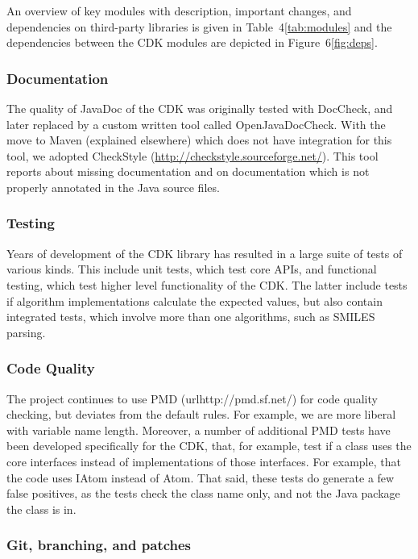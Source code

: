 \documentclass[10pt]{bmcart}
\begin{document}
An overview of key modules with description, important changes, and dependencies
on third-party libraries is given in Table~4\ref{tab:modules} and the dependencies
between the CDK modules are depicted in Figure~6\ref{fig:deps}.

  \subsubsection*{Documentation}

  The quality of JavaDoc of the CDK was originally tested with DocCheck, and
  later replaced by a custom written tool called OpenJavaDocCheck. With the move
  to Maven (explained elsewhere) which does not have integration for this tool,
  we adopted CheckStyle (\url{http://checkstyle.sourceforge.net/}). This tool
  reports about missing documentation and on documentation which is not properly
  annotated in the Java source files.

  \subsubsection*{Testing}

  Years of development of the CDK library has resulted in a large suite of
  tests of various kinds. This include unit tests, which test core APIs, and
  functional testing, which test higher level functionality of the CDK. The
  latter include tests if algorithm implementations calculate the expected
  values, but also contain integrated tests, which involve more than one
  algorithms, such as SMILES parsing.

  \subsubsection*{Code Quality}

The project continues to use PMD (url{http://pmd.sf.net/}) for code quality checking,
but deviates from the default rules. For example, we are more liberal with 
variable name length. Moreover, a number of additional PMD tests have been
developed specifically for the CDK, that, for example, test if a class uses
the core interfaces instead of implementations of those interfaces. For example,
that the code uses IAtom instead of Atom. That said, these tests do generate a
few false positives, as the tests check the class name only, and not the
Java package the class is in.

  \subsubsection*{Git, branching, and patches}
\end{document}
